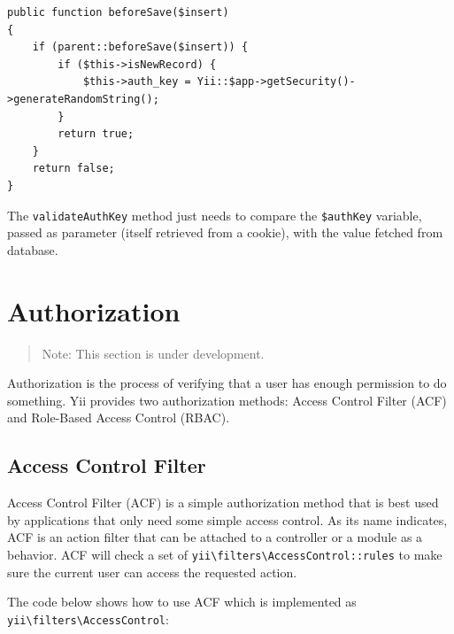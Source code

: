 \lstset{language=php}\begin{lstlisting}
public function beforeSave($insert)
{
    if (parent::beforeSave($insert)) {
        if ($this->isNewRecord) {
            $this->auth_key = Yii::$app->getSecurity()->generateRandomString();
        }
        return true;
    }
    return false;
}
\end{lstlisting}
The \lstinline|validateAuthKey| method just needs to compare the \lstinline|$authKey| variable, passed as parameter (itself retrieved from a cookie), with the value fetched from database.



\label{security-authorization.md}\section{Authorization}
\begin{quote}Note: This section is under development.

\end{quote}
Authorization is the process of verifying that a user has enough permission to do something. Yii provides two authorization
methods: Access Control Filter (ACF) and Role-Based Access Control (RBAC).

\subsection{Access Control Filter}
Access Control Filter (ACF) is a simple authorization method that is best used by applications that only need some
simple access control. As its name indicates, ACF is an action filter that can be attached to a controller or a module
as a behavior. ACF will check a set of \texttt{yii{\allowbreak{}\textbackslash}filters{\allowbreak{}\textbackslash}AccessControl\allowbreak{}::\allowbreak{}rules} to make sure the current user
can access the requested action.

The code below shows how to use ACF which is implemented as \texttt{yii{\allowbreak{}\textbackslash}filters{\allowbreak{}\textbackslash}AccessControl}:

